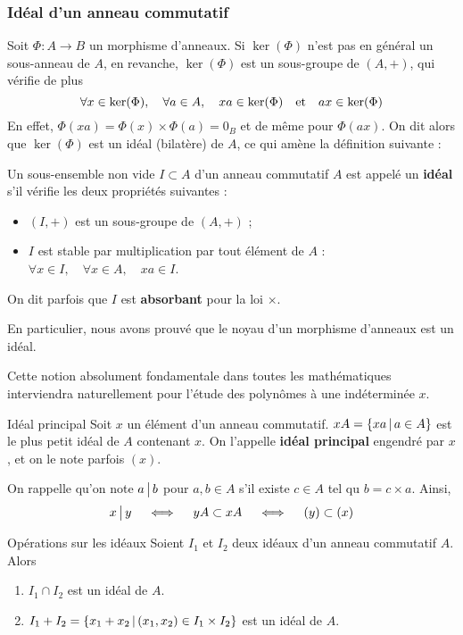     \subsubsection{Idéal d’un anneau commutatif}

    Soit $\Phi : A \to B$ un morphisme d’anneaux. Si $\ker(\Phi)$ n’est pas en général un sous-anneau de $A$, en revanche, $\ker(\Phi)$ est un sous-groupe de $(A,+)$, qui vérifie de plus 
    \[ \forall x \in \ker(\Phi), \quad \forall a \in A, \quad xa \in \ker(\Phi) \quad \text{et} \quad ax \in \ker(\Phi) \]   
    En effet, $\Phi(xa) = \Phi(x) \times \Phi(a) = 0_B$ et de même pour $\Phi(ax)$. On dit alors que $\ker(\Phi)$ est un idéal (bilatère) de $A$, ce qui amène la définition suivante :

    \begin{defi}{}{}
        Un sous-ensemble non vide $I \subset A$ d’un anneau commutatif $A$ est appelé un \textbf{idéal} s’il vérifie les deux propriétés suivantes :
        \begin{itemize}
            \item $(I,+)$ est un sous-groupe de $(A,+)$ ;
            \item $I$ est stable par multiplication par tout élément de $A$ : $\forall x \in I, \quad \forall x \in A, \quad xa \in I$.
        \end{itemize}
        On dit parfois que $I$ est \textbf{absorbant} pour la loi $\times$.
    \end{defi}

    En particulier, nous avons prouvé que le noyau d’un morphisme d’anneaux est un idéal.

    Cette notion absolument fondamentale dans toutes les mathématiques interviendra naturellement pour l’étude des polynômes à une indéterminée $x$.

    \begin{defitheo}{Idéal principal}{}
        Soit $x$ un élément d’un anneau commutatif. $xA = \left\{xa \, \middle| \, a \in A\right\}$ est le plus petit idéal de $A$ contenant $x$. On l’appelle \textbf{idéal principal} engendré par $x$, et on le note parfois $(x)$.
    \end{defitheo}

    On rappelle qu’on note $a \, \big| \, b$ pour $a,b \in A$ s’il existe $c \in A$ tel qu $b = c \times a$. Ainsi, 
    \[ x \, \big| \, y \quad \iff \quad yA \subset x A \quad \iff \quad (y) \subset (x) \]   

    \begin{prop}{Opérations sur les idéaux}{}
        Soient $I_1$ et $I_2$ deux idéaux d’un anneau commutatif $A$. Alors 
        \begin{enumerate}
            \item $I_1 \cap I_2$ est un idéal de $A$.
            \item $I_1 + I_2 = \left\{x_1 + x_2 \, \middle| \, (x_1,x_2) \in I_1 \times I_2\right\}$ est un idéal de $A$.
        \end{enumerate}
    \end{prop}

